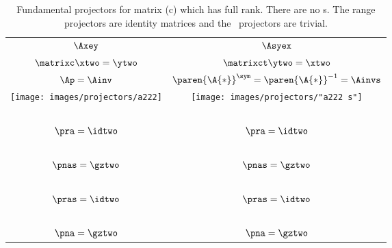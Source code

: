 \clearpage
\begin{table}[htdp]
\caption[Fundamental projectors for matrix (c)]{Fundamental projectors for matrix (c) which has full rank. There are no \ns s. The range projectors are identity matrices and the \ns \ projectors are trivial.}
\begin{center}
\begin{tabular}{cc}
%
  $\Axey$ & $\Asyex$\\
%
  $\matrixc  \xtwo = \ytwo$ &
  $\matrixct \ytwo = \xtwo$ \\[15pt]
%
$\Ap = \Ainv$ & $\paren{\A{*}}^{\sym} = \paren{\A{*}}^{-1} = \Ainvs$ \\
%
\texttt{[image: images/projectors/a222]} &
\texttt{[image: images/projectors/"a222 s"]} \\[5pt]\hline
\ \\
 $\pra  = \idtwo$ & $\pra  = \idtwo$ \\
\ \\
 $\pnas = \gztwo$  & $\pnas = \gztwo$ \\
\ \\
 $\pras = \idtwo$ & $\pras = \idtwo$ \\
\ \\
 $\pna  = \gztwo$  & $\pna  = \gztwo$
%
\end{tabular}
\end{center}
\label{tab:projector summary:c}
\end{table}

\endinput